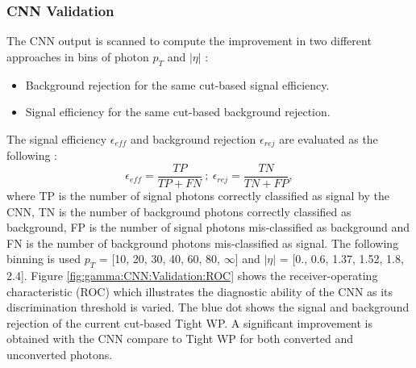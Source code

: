 \subsubsection{CNN Validation}
\label{gamma:CNN:Validation}
The CNN output is scanned to compute the improvement in two different approaches in bins of photon $p_T$ and $|\eta|$ : 
\begin{itemize}
    \item Background rejection for the same cut-based signal efficiency.
    \item Signal efficiency for the same cut-based background rejection.
\end{itemize} 
The signal efficiency $\epsilon_{eff}$ and background rejection $\epsilon_{rej}$ are evaluated as the following :
\begin{equation}
    \label{eq:eff}
    \epsilon_{eff} = \frac{TP}{TP+FN} \ ; \ \epsilon_{rej} = \frac{TN}{TN+FP},
\end{equation}
where TP is the number of signal photons correctly classified as signal by the CNN, TN is the number of background photons correctly classified as background, FP is the number of signal photons mis-classified as background and FN is the number of background photons mis-classified as signal. The following binning is used $p_T$ = [10, 20, 30, 40, 60, 80, $\infty$] and $|\eta|$ = [0., 0.6, 1.37, 1.52, 1.8, 2.4].
Figure \ref{fig:gamma:CNN:Validation:ROC} shows the receiver-operating characteristic (ROC) which illustrates the diagnostic ability of the CNN as its discrimination threshold is varied. The blue dot shows the signal and background rejection of the current cut-based Tight WP. A significant improvement is obtained with the CNN compare to Tight WP for both converted and unconverted photons. 
